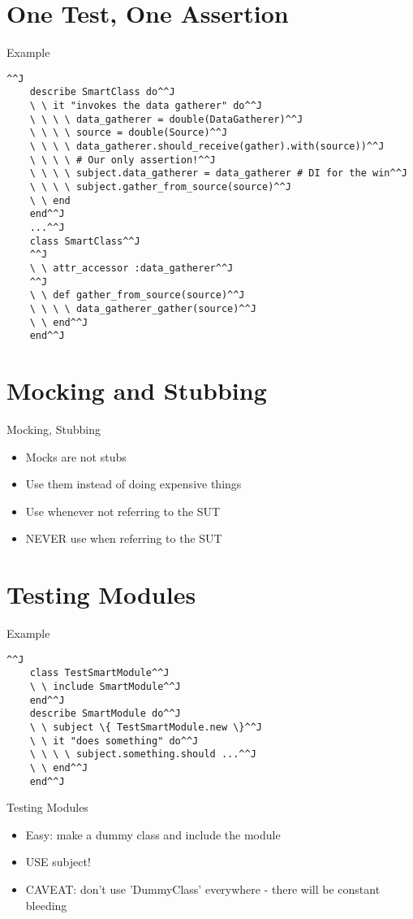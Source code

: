 \documentclass[style=paintings,display=slides,clock]{powerdot}
\begin{document}
\section{One Test, One Assertion}
\begin{slide}{Example}
	\begin{lstlisting}[frame=shadowbox]^^J
	describe SmartClass do^^J
	\ \ it "invokes the data gatherer" do^^J
	\ \ \ \ data_gatherer = double(DataGatherer)^^J
	\ \ \ \ source = double(Source)^^J
	\ \ \ \ data_gatherer.should_receive(gather).with(source))^^J
	\ \ \ \ # Our only assertion!^^J
	\ \ \ \ subject.data_gatherer = data_gatherer # DI for the win^^J
	\ \ \ \ subject.gather_from_source(source)^^J
	\ \ end
	end^^J
	...^^J
	class SmartClass^^J
	^^J
	\ \ attr_accessor :data_gatherer^^J
	^^J
	\ \ def gather_from_source(source)^^J
	\ \ \ \ data_gatherer_gather(source)^^J
	\ \ end^^J
	end^^J
	\end{lstlisting}
\end{slide}
\section{Mocking and Stubbing}
\begin{note}{Mocking, Stubbing}
	\begin{itemize}
		\item Mocks are not stubs
		\item Use them instead of doing expensive things
		\item Use whenever not referring to the SUT
		\item NEVER use when referring to the SUT
	\end{itemize}
\end{note}
\section{Testing Modules}
\begin{slide}{Example}
	\begin{lstlisting}[frame=shadowbox]^^J
	class TestSmartModule^^J
	\ \ include SmartModule^^J
	end^^J
	describe SmartModule do^^J
	\ \ subject \{ TestSmartModule.new \}^^J
	\ \ it "does something" do^^J
	\ \ \ \ subject.something.should ...^^J
	\ \ end^^J
	end^^J
	\end{lstlisting}
\end{slide}
\begin{note}{Testing Modules}
	\begin{itemize}
		\item Easy: make a dummy class and include the module
		\item USE subject!
		\item CAVEAT: don't use 'DummyClass' everywhere - there will be constant bleeding
	\end{itemize}
\end{note}
\end{document}
